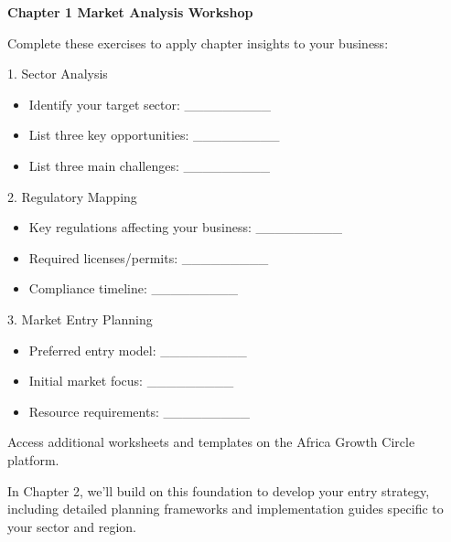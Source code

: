 \begin{workshopbox}
\textbf{Chapter 1 Market Analysis Workshop}

Complete these exercises to apply chapter insights to your business:

1. Sector Analysis
\begin{itemize}
    \item Identify your target sector: \_\_\_\_\_\_\_\_\_
    \item List three key opportunities: \_\_\_\_\_\_\_\_\_
    \item List three main challenges: \_\_\_\_\_\_\_\_\_
\end{itemize}

2. Regulatory Mapping
\begin{itemize}
    \item Key regulations affecting your business: \_\_\_\_\_\_\_\_\_
    \item Required licenses/permits: \_\_\_\_\_\_\_\_\_
    \item Compliance timeline: \_\_\_\_\_\_\_\_\_
\end{itemize}

3. Market Entry Planning
\begin{itemize}
    \item Preferred entry model: \_\_\_\_\_\_\_\_\_
    \item Initial market focus: \_\_\_\_\_\_\_\_\_
    \item Resource requirements: \_\_\_\_\_\_\_\_\_
\end{itemize}

Access additional worksheets and templates on the Africa Growth Circle platform.
\end{workshopbox}

\begin{importantbox}
In Chapter 2, we'll build on this foundation to develop your entry strategy, including detailed planning frameworks and implementation guides specific to your sector and region.
\end{importantbox}